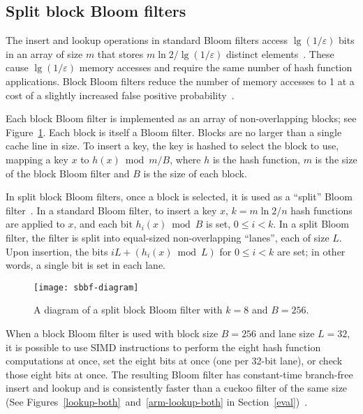 \documentclass[letterpaper,twocolumn,10pt]{article}
\newcommand{\etal}{et al.}
\begin{document}
\subsection{Split block Bloom filters}



The insert and lookup operations in standard Bloom filters access $\lg (1/\varepsilon)$ bits in an array of size $m$ that stores $m \ln 2 / \lg(1/\varepsilon)$ distinct elements~\cite{bloom-original}.
These cause $\lg (1/\varepsilon)$ memory accesses and require the same number of hash function applications.
Block Bloom filters reduce the number of memory accesses to 1 at a cost of a slightly increased false positive probability~\cite{block-bloom}.

Each block Bloom filter is implemented as an array of non-overlapping blocks; see Figure~\ref{sbbf-diagram}.
Each block is itself a Bloom filter.
Blocks are no larger than a single cache line in size.
To insert a key, the key is hashed to select the block to use, mapping a key $x$ to $h(x) \bmod m/B$, where $h$ is the hash function, $m$ is the size of the block Bloom filter and $B$ is the size of each block.

In split block Bloom filters, once a block is selected, it is used as a ``split'' Bloom filter~\cite{split-bloom}.
In a standard Bloom filter, to insert a key $x$, $k = m \ln 2 / n$ hash functions are applied to $x$, and each bit $h_i(x) \bmod B$ is set, $0 \le i < k$.
In a split Bloom filter, the filter is split into equal-sized non-overlapping ``lanes'', each of size $L$.
Upon insertion, the bits $i L + (h_i(x) \bmod L)$ for $0 \le i < k$ are set; in other words, a single bit is set in each lane.

\begin{figure}[b!]
  \texttt{[image: sbbf-diagram]}
\caption{\label{sbbf-diagram}
A diagram of a split block Bloom filter with $k = 8$ and $B = 256$.
}
\end{figure}

When a block Bloom filter is used with block size $B = 256$ and lane size $L = 32$, it is possible to use SIMD instructions to perform the eight hash function computations at once, set the eight bits at once (one per 32-bit lane), or check those eight bits at once.
The resulting Bloom filter has constant-time branch-free insert and lookup and is consistently faster than a cuckoo filter of the same size (See Figures~\ref{lookup-both}~and~\ref{arm-lookup-both} in Section~\ref{eval})~\cite{cuckoo-filter-github,ultra-fast,overtakes,impala-bloom}.
\end{document}
